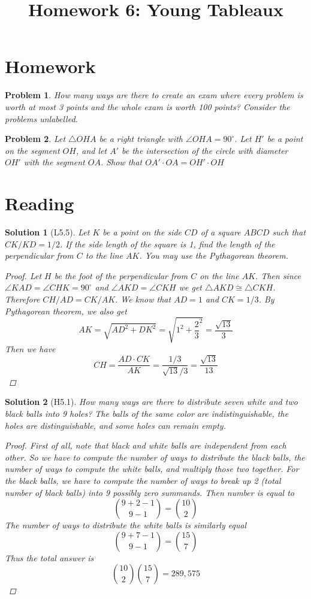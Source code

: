 \documentclass[a4paper,12pt]{article}
\title{Homework 6: Young Tableaux}
\theoremstyle{perfect}
\newtheorem{prb}{Problem}
\newtheorem{sol}{Solution}
\begin{document}
 
\maketitle

\section{Homework}

\begin{prb}
How many ways are there to create an exam where every problem is worth at most 3 points and the whole exam is worth 100 points? Consider the problems unlabelled.
\end{prb}

\begin{prb}
Let $\triangle OHA$ be a right triangle with $\angle OHA= 90^\circ$. Let $H'$ be a point on the segment $OH$, and let $A'$ be the intersection of the circle with diameter $OH'$ with the segment $OA$. Show that $OA'\cdot OA = OH' \cdot OH$
\end{prb}

\section{Reading}

\begin{sol}[L5.5]
\textit{Let $K$ be a point on the side $CD$ of a square $ABCD$ such that $CK/KD = 1/2$. If the side length of the square is 1, find the length of the perpendicular from $C$ to the line $AK$. You may use the Pythagorean theorem.}
\begin{proof}
Let $H$ be the foot of the perpendicular from $C$ on the line $AK$. Then since $\angle KAD = \angle CHK = 90^\circ$ and $\angle AKD = \angle CKH$ we get $\triangle AKD \cong \triangle CKH$. Therefore $CH/AD = CK/AK$. We know that $AD = 1$ and $CK = 1/3$. By Pythagorean theorem, we also get $$AK = \sqrt{AD^2+DK^2} = \sqrt{1^2+\frac{2}{3}^2} = \frac{\sqrt{13}}{3}$$ Then we have $$CH = \frac{AD\cdot CK}{AK} = \frac{1/3}{\sqrt{13}/3} = \frac{\sqrt{13}}{13}$$
\end{proof}
\end{sol}

\begin{sol}[H5.1]
\textit{How many ways are there to distribute seven white and two black balls into 9 holes? The balls of the same color are indistinguishable, the holes are distinguishable, and some holes can remain empty.}
\begin{proof}
First of all, note that black and white balls are independent from each other. So we have to compute the number of ways to distribute the black balls, the number of ways to compute the white balls, and multiply those two together. For the black balls, we have to compute the number of ways to break up 2 (total number of black balls) into 9 possibly zero summands. Then number is equal to $${{9+2-1} \choose {9-1}} = {10 \choose 2}$$ The number of ways to distribute the white balls is similarly equal $${{9+7-1} \choose {9-1}} = {15 \choose 7}$$ Thus the total answer is $${10 \choose 2}{15 \choose 7} = 289,575$$
\end{proof}
\end{sol}
\end{document}
